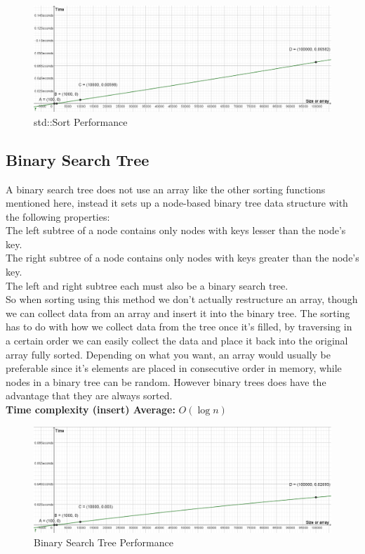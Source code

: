\documentclass{article}
\begin{document}
\begin{figure}[h]
	\centering
	\includegraphics[width=1\linewidth]{"images/std Sort"}
	\caption{std::Sort Performance}
	\label{fig:std-sort}
\end{figure}




\subsection{Binary Search Tree}

A binary search tree does not use an array like the other sorting functions mentioned here, instead it sets up a node-based binary tree data structure with the following properties:
\\The left subtree of a node contains only nodes with keys lesser than the node’s key.
\\The right subtree of a node contains only nodes with keys greater than the node’s key.
\\The left and right subtree each must also be a binary search tree.
\\So when sorting using this method we don't actually restructure an array, though we can collect data from an array and insert it into the binary tree. The sorting has to do with how we collect data from the tree once it's filled, by traversing in a certain order we can easily collect the data and place it back into the original array fully sorted.
Depending on what you want, an array would usually be preferable since it's elements are placed in consecutive order in memory, while nodes in a binary tree can be random. However binary trees does have the advantage that they are always sorted.
\\
\textbf{Time complexity (insert) Average:} $O(\log n)$\\

\begin{figure}[h]
	\centering
	\includegraphics[width=1\linewidth]{"images/Binary Search Tree"}
	\caption{Binary Search Tree Performance}
	\label{fig:binary-search-tree}
\end{figure}
\end{document}
